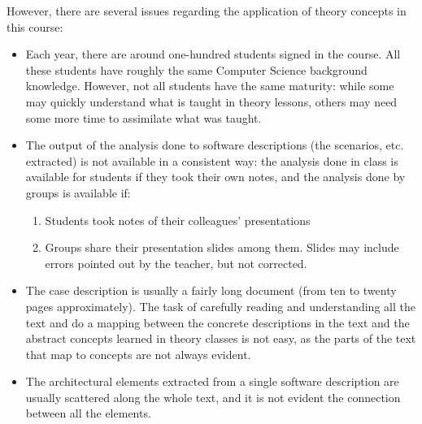 However, there are several issues regarding the application of theory concepts in this course:
\begin{itemize}
\item Each year, there are around one-hundred students signed in the course. All these students have roughly the same Computer Science background knowledge. However, not all students have the same maturity: while some may quickly understand what is taught in theory lessons, others may need some more time to assimilate what was taught.

\item The output of the analysis done to software descriptions (the scenarios, etc. extracted) is not available in a consistent way: the analysis done in class is available for students if they took their own notes, and the analysis done by groups is available if:
\begin{enumerate}
\item Students took notes of their colleagues' presentations 

\item Groups share their presentation slides among them. Slides may include errors pointed out by the teacher, but not corrected.
\end{enumerate} 

\item The case description is usually a fairly long document (from ten to twenty pages approximately). The task of carefully reading and understanding all the text and do a mapping between the concrete descriptions in the text and the abstract concepts learned in theory classes is not easy, as the parts of the text that map to concepts are not always evident.

\item The architectural elements extracted from a single software description are usually scattered along the whole text, and it is not evident the connection between all the elements.
\end{itemize}
